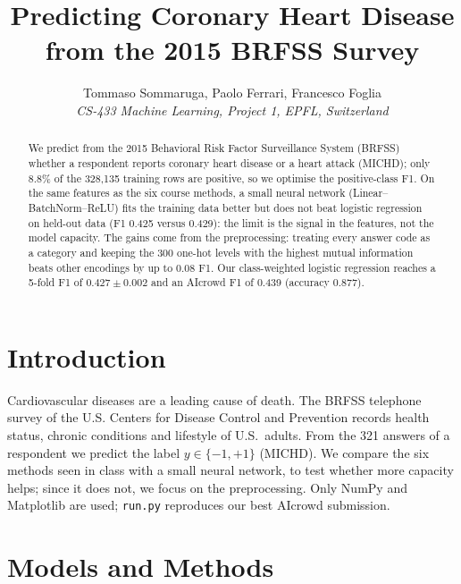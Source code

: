 \documentclass[10pt,conference,compsocconf]{IEEEtran}
\begin{document}
\title{Predicting Coronary Heart Disease\\from the 2015 BRFSS Survey}

\author{
  Tommaso Sommaruga, Paolo Ferrari, Francesco Foglia\\
  \textit{CS-433 Machine Learning, Project 1, EPFL, Switzerland}
}

\maketitle

\begin{abstract}
We predict from the 2015 Behavioral Risk Factor Surveillance System (BRFSS)
whether a respondent reports coronary heart disease or a heart attack (MICHD);
only 8.8\% of the 328{,}135 training rows are positive, so we optimise the
positive-class F1. On the same features as the six course methods, a small
neural network (Linear--BatchNorm--ReLU) fits the training data better but does
not beat logistic regression on held-out data (F1 0.425 versus 0.429): the limit
is the signal in the features, not the model capacity. The gains come from the
preprocessing: treating every answer code as a category and keeping the 300
one-hot levels with the highest mutual information beats other encodings by up
to 0.08 F1. Our class-weighted logistic regression reaches a 5-fold F1 of
$0.427\pm0.002$ and an AIcrowd F1 of 0.439 (accuracy 0.877).
\end{abstract}

\section{Introduction}
Cardiovascular diseases are a leading cause of death. The BRFSS telephone survey of the U.S.
Centers for Disease Control and Prevention records health status, chronic
conditions and lifestyle of U.S.\ adults. From the 321 answers of a respondent
we predict the label $y\in\{-1,+1\}$ (MICHD). We compare the six methods seen in
class with a small neural network, to test whether more capacity helps; since it
does not, we focus on the preprocessing.
Only NumPy and Matplotlib are used; \texttt{run.py} reproduces our best AIcrowd
submission.

\section{Models and Methods}
\end{document}
